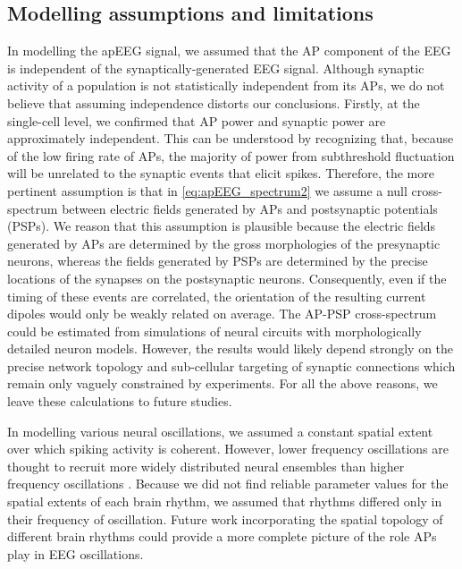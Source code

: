 \subsection{Modelling assumptions and limitations}
In modelling the apEEG signal, we assumed that the AP component of the EEG is independent of the synaptically-generated EEG signal. Although synaptic activity of a population is not statistically independent from its APs, we do not believe that assuming independence distorts our conclusions. Firstly, at the single-cell level, we confirmed that AP power and synaptic power are approximately independent. This can be understood by recognizing that, because of the low firing rate of APs, the majority of power from subthreshold fluctuation will be unrelated to the synaptic events that elicit spikes. Therefore, the more pertinent assumption is that in {\ref{eq:apEEG_spectrum2}} we assume a null cross-spectrum between electric fields generated by APs and postsynaptic potentials (PSPs). We reason that this assumption is plausible because the electric fields generated by APs are determined by the gross morphologies of the presynaptic neurons, whereas the fields generated by PSPs are determined by the precise locations of the synapses on the postsynaptic neurons\cite{Ahlfors2015,Brake2024}. Consequently, even if the timing of these events are correlated, the orientation of the resulting current dipoles would only be weakly related on average. The AP-PSP cross-spectrum could be estimated from simulations of neural circuits with morphologically detailed neuron models. However, the results would likely depend strongly on the precise network topology and sub-cellular targeting of synaptic connections which remain only vaguely constrained by experiments. For all the above reasons, we leave these calculations to future studies.

In modelling various neural oscillations, we assumed a constant spatial extent over which spiking activity is coherent. However, lower frequency oscillations are thought to recruit more widely distributed neural ensembles than higher frequency oscillations \cite{Buzsaki2006}. Because we did not find reliable parameter values for the spatial extents of each brain rhythm, we assumed that rhythms differed only in their frequency of oscillation. Future work incorporating the spatial topology of different brain rhythms could provide a more complete picture of the role APs play in EEG oscillations.

